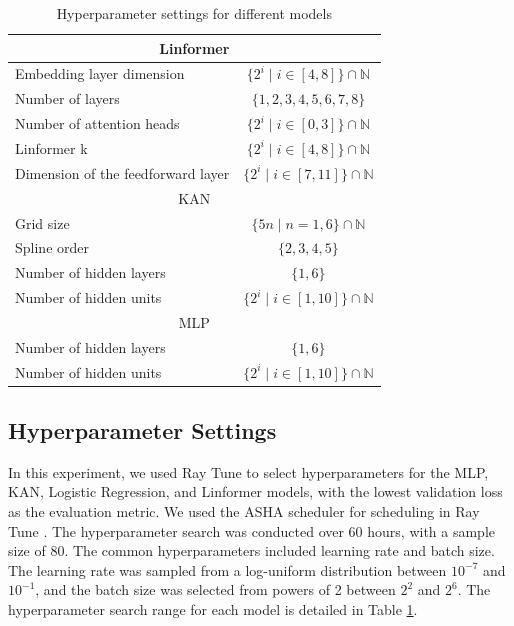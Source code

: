 \documentclass{article}
\begin{document}
\begin{table}[!h]
    \centering
    \caption{Hyperparameter settings for different models}
    \label{tab:model_hyperparams}
    \begin{tabular}{l c}
        \hline
        \multicolumn{2}{c}{Linformer} \\
        \hline
        Embedding layer dimension & $\{2^i \mid i \in [4, 8]\} \cap \mathbb{N}$ \\
        Number of layers & $\{1, 2, 3, 4, 5, 6, 7, 8\}$ \\
        Number of attention heads & $\{2^i \mid i \in [0, 3]\} \cap \mathbb{N}$ \\
        Linformer k & $\{2^i \mid i \in [4, 8]\} \cap \mathbb{N}$ \\
        Dimension of the feedforward layer & $\{2^i \mid i \in [7, 11]\} \cap \mathbb{N}$ \\
        \hline
        \multicolumn{2}{c}{KAN} \\
        \hline
        Grid size & $\{5n \mid n=1, 6\} \cap \mathbb{N}$ \\
        Spline order & $\{2, 3, 4, 5\}$ \\
        Number of hidden layers & $\{1, 6\}$ \\
        Number of hidden units & $\{2^i \mid i \in [1, 10]\} \cap \mathbb{N}$ \\
        \hline
        \multicolumn{2}{c}{MLP} \\
        \hline
        Number of hidden layers & $\{1, 6\}$ \\
        Number of hidden units & $\{2^i \mid i \in [1, 10]\} \cap \mathbb{N}$ \\
        \hline
    \end{tabular}
\end{table}

\subsection{Hyperparameter Settings}
In this experiment, we used Ray Tune to select hyperparameters for the MLP, KAN, Logistic Regression, and Linformer models, with the lowest validation loss as the evaluation metric. We used the ASHA scheduler \parencite{li2018massively} for scheduling in Ray Tune \parencite{RayTuneFast}. The hyperparameter search was conducted over 60 hours, with a sample size of 80. The common hyperparameters included learning rate and batch size. The learning rate was sampled from a log-uniform distribution between $10^{-7}$ and $10^{-1}$, and the batch size was selected from powers of 2 between $2^2$ and $2^6$. The hyperparameter search range for each model is detailed in Table \ref{tab:model_hyperparams}. 
\end{document}
